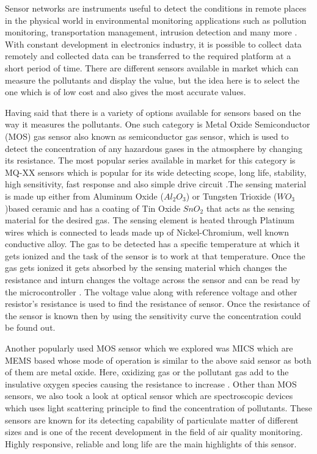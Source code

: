 Sensor networks are instruments useful to detect the conditions in remote places in the physical world in environmental monitoring applications such as pollution monitoring, transportation management, intrusion detection and many more \cite{Jung2011}. With constant development in electronics industry, it is possible to collect data remotely and collected data can be transferred to the required platform at a short period of time.
There are different sensors available in market which can measure the pollutants and display the value, but the idea here is to select the one which is of low cost and also gives the most accurate values.
\par
Having said that there is a variety of options available for sensors based on the way it measures the pollutants. One such category is Metal Oxide Semiconductor (MOS) gas sensor also known as semiconductor gas sensor, which is used to detect the concentration of any hazardous gases in the atmosphere by changing its resistance. The most popular series available in market for this category is MQ-XX sensors which is popular for its wide detecting scope, long life, stability, high sensitivity, fast response and also simple drive circuit \cite{Data2012}.The sensing material is made up either from Aluminum Oxide ($ Al_{2}O_{3}$) or Tungsten Trioxide ($WO_3$)based ceramic and has a coating of Tin Oxide $ SnO_{2} $ that acts as the sensing material for the desired gas. The sensing element is heated through Platinum wires which is connected to leads made up of Nickel-Chromium, well known conductive alloy. The gas to be detected has a specific temperature at which it gets ionized and the task of the sensor is to work at that temperature. Once the gas gets ionized it gets absorbed by the sensing material which changes the resistance and inturn changes the voltage across the sensor and can be read by the microcontroller \cite{gassensor}. The voltage value along with reference voltage and other resistor's resistance is used to find the resistance of sensor. Once the resistance of the sensor is known then by using the sensitivity curve the concentration could be found out. 

Another popularly used  MOS sensor which we explored was MICS which are MEMS based whose mode of operation is similar to the above said sensor as both of them are metal oxide. Here, oxidizing gas or the pollutant gas add to the insulative oxygen species causing the resistance to increase \cite{SGXSensortech}.
 Other than MOS sensors, we also took a look at optical sensor which are spectroscopic devices which uses light scattering principle to find the concentration of pollutants. These sensors are known for its detecting capability of particulate matter of different sizes and is one of the recent development in the field of air quality monitoring. Highly responsive, reliable and long life are the main highlights of this sensor.
